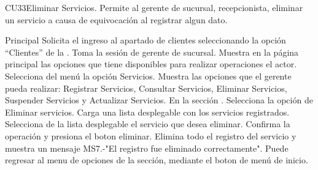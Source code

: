 



	\begin{UseCase}{CU33}{Eliminar Servicios.}{
		Permite al gerente de sucursal, recepcionista, eliminar un servicio a causa de equivocación al registrar algun dato.
	}
	\end{UseCase}

	\begin{UCtrayectoria}{Principal}
		\UCpaso[\UCactor] Solicita el ingreso al apartado de clientes seleccionando la opción ``Clientes'' de la .
		\UCpaso Toma la sesión de gerente de sucursal.
		\UCpaso Muestra en la página principal las opciones que tiene disponibles para realizar operaciones el actor.
		\UCpaso[\UCactor] Selecciona del menú la opción Servicios.
		\UCpaso Muestra las opciones que el gerente pueda realizar: Registrar Servicios, Consultar Servicios, Eliminar Servicios, Suspender Servicios y Actualizar Servicios. En la sección .
		\UCpaso[\UCactor] Selecciona la opción de Eliminar servicios.
		\UCpaso Carga una lista desplegable con los servicios registrados. 
		\UCpaso[\UCactor] Selecciona de la lista desplegable el servicio que desea eliminar.
		\UCpaso[\UCactor] Confirma la operación y presiona el boton eliminar.
		\UCpaso Elimina todo el registro del servicio y muestra un mensaje MS7.-"El registro fue eliminado correctamente".
		\UCpaso[\UCactor] Puede regresar al menu de opciones de la sección, mediante el boton de menú de inicio.
	\end{UCtrayectoria}

